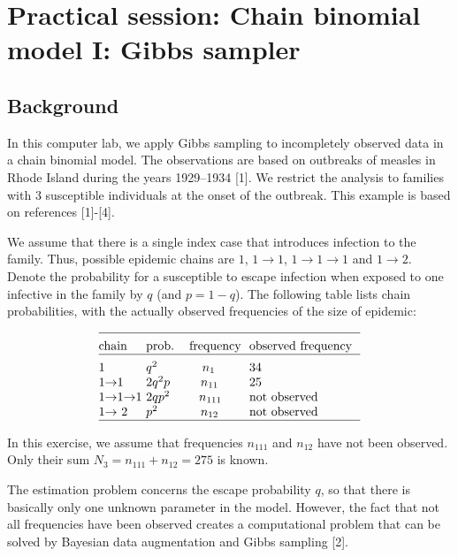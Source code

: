 \documentclass[11pt]{article}
\begin{document}
\setlength{\parskip}{0.25cm}

\addtolength{\baselineskip}{0.2\baselineskip}  
\pagestyle{myheadings}   

\section*{Practical session:\hfill\break 
Chain binomial model I: Gibbs sampler}

\bigskip

\subsection*{Background}

In this computer lab, we apply Gibbs sampling to incompletely 
observed data in a chain binomial model.  The observations are based 
on outbreaks of measles in Rhode Island 
during the years 1929--1934 [1]. We restrict the analysis to 
families with 3 susceptible individuals at the onset of the outbreak. 
This example is based on references [1]-[4].

We assume that there is a single index case that introduces infection
to the family. Thus, possible epidemic chains are $1$, $1\to 1$, $1\to 1\to 1$ 
and $1\to 2$. Denote the probability for a susceptible to escape infection
when exposed to one infective in the family by $q$ (and $p=1-q$). The 
following table lists chain probabilities, with the 
actually observed frequencies of the size of epidemic:

$$\vbox{
  {\offinterlineskip
   \halign{ \strut  #\hfill  &\vrule width0pt 
# 
&\ # 
& #
& #
& # \cr
\multispan{4}\hrulefill\cr
 \omit & height5pt & &\cr
chain  &prob. &frequency &observed frequency \cr
\multispan{4}\hrulefill\cr
            \omit & height5pt &\cr
1 &$q^2$ &$n_1$ &34\cr
1$\to$1 &$2q^2p$ &$n_{11}$ &25\cr
1$\to$1$\to$1 &$2qp^2$  &$n_{111}$ &not observed\hfill\cr
1$\to$ 2 &$p^2$ &$n_{12}$ &not observed\hfill \cr
\multispan{4}\hrulefill\cr
}}}$$

In this exercise, we assume that frequencies $n_{111}$ and $n_{12}$ 
have not been observed. Only their sum $N_3 = n_{111} + n_{12} = 275$ 
is known.

The estimation problem concerns the escape probability $q$, so that
there is basically only one unknown parameter in the model. 
However, the fact that not all frequencies have been observed 
creates a computational problem that can be solved by Bayesian
data augmentation and Gibbs sampling [2].
\end{document}
